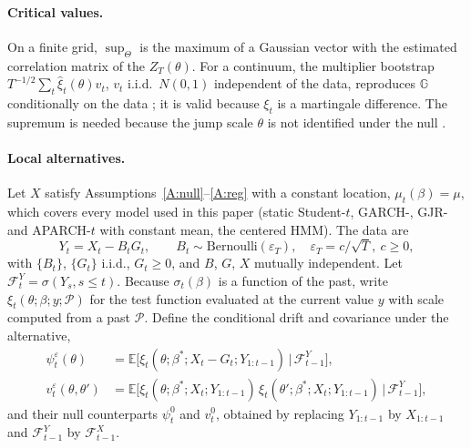 \documentclass[11pt,a4paper]{article}
\theoremstyle{definition}
\theoremstyle{remark}
\newcommand{\E}{\mathbb{E}}
\newcommand{\F}{\mathcal{F}}
\begin{document}
\paragraph{Critical values.} On a finite grid, $\sup_\Theta$ is the maximum of a Gaussian vector with the estimated correlation matrix of the $Z_T(\theta)$. For a continuum, the multiplier bootstrap $T^{-1/2}\sum_t\hat\xi_t(\theta)v_t$, $v_t$ i.i.d.\ $N(0,1)$ independent of the data, reproduces $\mathbb G$ conditionally on the data \citep{hansen1996}; it is valid because $\xi_t$ is a martingale difference. The supremum is needed because the jump scale $\theta$ is not identified under the null \citep{davies1977,davies1987,andrews1994ap,hansen1992}.

\paragraph{Local alternatives.} Let $X$ satisfy Assumptions~\ref{A:null}--\ref{A:reg} with a constant location, $\mu_t(\beta)=\mu$, which covers every model used in this paper (static Student-$t$, GARCH-, GJR- and APARCH-$t$ with constant mean, the centered HMM). The data are
\[
Y_t=X_t-B_tG_t,\qquad B_t\sim\text{Bernoulli}(\varepsilon_T),\quad\varepsilon_T=c/\sqrt T,\ c\ge0,
\]
with $\{B_t\}$, $\{G_t\}$ i.i.d., $G_t\ge0$, and $B$, $G$, $X$ mutually independent. Let $\F^Y_t=\sigma(Y_s,s\le t)$. Because $\sigma_t(\beta)$ is a function of the past, write $\xi_t(\theta;\beta;y;\mathcal P)$ for the test function evaluated at the current value $y$ with scale computed from a past $\mathcal P$. Define the conditional drift and covariance under the alternative,
\[
\begin{aligned}
\psi^{\varepsilon}_t(\theta)&=\E\big[\xi_t(\theta;\beta^*;X_t-G_t;Y_{1:t-1})\,\big|\,\F^Y_{t-1}\big],\\
v^{\varepsilon}_t(\theta,\theta')&=\E\big[\xi_t(\theta;\beta^*;X_t;Y_{1:t-1})\,\xi_t(\theta';\beta^*;X_t;Y_{1:t-1})\,\big|\,\F^Y_{t-1}\big],
\end{aligned}
\]
and their null counterparts $\psi^0_t$ and $v^0_t$, obtained by replacing $Y_{1:t-1}$ by $X_{1:t-1}$ and $\F^Y_{t-1}$ by $\F^X_{t-1}$.
\end{document}
